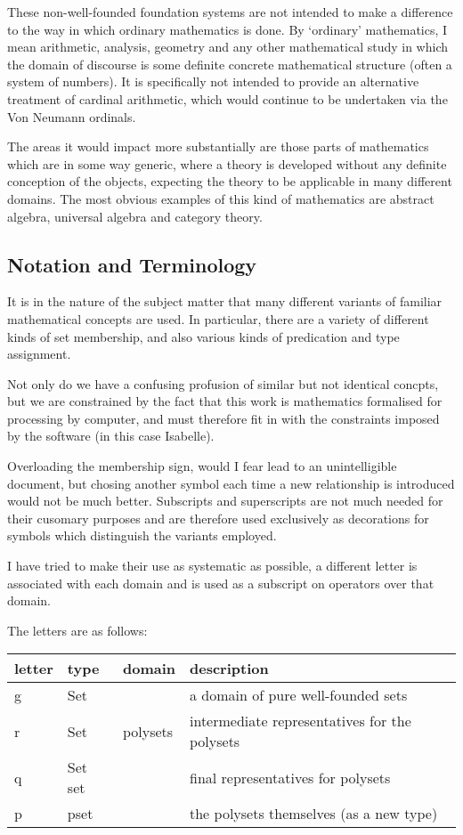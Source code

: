 \documentclass[11pt,a4paper]{article}
\begin{document}
These non-well-founded foundation systems are not intended to make a difference to the way in which ordinary mathematics is done.
By `ordinary' mathematics, I mean arithmetic, analysis, geometry and any other mathematical study in which the domain of discourse is some definite concrete mathematical structure (often a system of numbers).
It is specifically not intended to provide an alternative treatment of cardinal arithmetic, which would continue to be undertaken via the Von Neumann ordinals.

The areas it would impact more substantially are those parts of mathematics which are in some way generic, where a theory is developed without any definite conception of the objects, expecting the theory to be applicable in many different domains.
The most obvious examples of this kind of mathematics are abstract algebra, universal algebra and category theory.

\subsection{Notation and Terminology}

It is in the nature of the subject matter that many different variants of familiar mathematical concepts are used.
In particular, there are a variety of different kinds of set membership, and also various kinds of predication and type assignment.

Not only do we have a confusing profusion of similar but not identical concpts, but we are constrained by the fact that this work is mathematics formalised for processing by computer, and must therefore fit in with the constraints imposed by the software (in this case Isabelle).

Overloading the membership sign, would I fear lead to an unintelligible document, but chosing another symbol each time a new relationship is introduced would not be much better.
Subscripts and superscripts are not much needed for their cusomary purposes and are therefore used exclusively as decorations for symbols which distinguish the variants employed.

I have tried to make their use as systematic as possible, a different letter is associated with each domain and is used as a subscript on operators over that domain.

The letters are as follows:

\begin{centering}
\begin{tabular}{| l | l | l | l |}
\hline
letter & type & domain & description \\
\hline
g & Set & & a domain of pure well-founded sets \\
r & Set & polysets & intermediate representatives for the polysets \\
q & Set set & & final representatives for polysets \\
p & pset & & the polysets themselves (as a new type) \\
\hline
\end{tabular}
\end{centering}

\newpage

\newpage

\newpage


%
%
\end{document}
